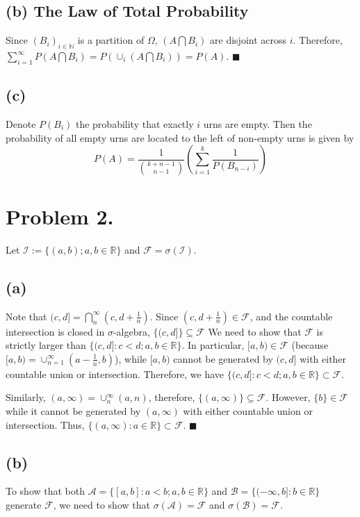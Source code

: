 \documentclass[11pt]{article}
\theoremstyle{definition}
\theoremstyle{boldtitle} %
\numberwithin{equation}{section}
\numberwithin{figure}{section}
\numberwithin{table}{section}
\begin{document}
\subsection*{(b) The Law of Total Probability}
Since $(B_i)_{i \in \mathbb{N}}$ is a partition of $\Omega$,
$(A \bigcap B_i)$ are disjoint across $i$.
Therefore, $\sum_{i = 1}^\infty P(A \bigcap B_i) = P(\cup_i (A \bigcap B_i)) = P(A)$. \(\blacksquare\)


\subsection*{(c)} 
Denote $P(B_i)$ the probability that exactly $i$ urns are empty.
Then the probability of all empty urns are located to the left of non-empty urns is given by 
\[
P(A) = \frac{1}{\binom{k+n-1}{n-1}} \left(\sum_{i=1}^{k} \frac{1}{P(B_{n - i})} \right)
\]


\section*{Problem 2.}
Let $\mathcal{I} := \{(a, b); a, b \in \mathbb{R}\}$ and $\mathcal{F} = \sigma (\mathcal{I})$.
\subsection*{(a)} 
Note that $(c, d] = \bigcap_{n}^\infty (c, d+\frac{1}{n})$. 
Since $(c, d+\frac{1}{n}) \in \mathcal{F}$, and the countable intersection is closed in $\sigma$-algebra,
$
\{(c, d]\} \subseteq \mathcal{F}
$
We need to show that $\mathcal{F}$ is strictly larger than $\{(c, d]: c < d; a, b \in \mathbb{R} \}$.
In particular, $[a,b) \in \mathcal{F}$ (because $[a,b) = \cup_{n=1}^\infty (a - \frac{1}{n},b)$),
while $[a,b)$ cannot be generated by $(c,d]$ with either countable union or intersection.
Therefore, we have $\{(c, d]: c < d; a, b \in \mathbb{R} \} \subset \mathcal{F}$.


Similarly, $(a, \infty) = \cup_{n}^\infty (a, n)$,
therefore, $\{(a, \infty)\} \subseteq \mathcal{F}$.
However, $\{b\} \in \mathcal{F}$ while it cannot be generated by $(a, \infty)$ with either countable union or intersection.
Thus, $\{(a, \infty): a \in \mathbb{R} \} \subset \mathcal{F}$. \(\blacksquare\)

\subsection*{(b)} 
To show that both $\mathcal{A} = \{[a, b]: a < b; a, b \in \mathbb{R} \}$ and $\mathcal{B} = \{(-\infty, b]: b \in \mathbb{R} \}$ generate $\mathcal{F}$,
we need to show that $\sigma(\mathcal{A}) = \mathcal{F}$ and $\sigma(\mathcal{B}) = \mathcal{F}$.
\end{document}
